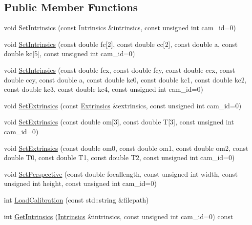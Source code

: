 \subsection*{Public Member Functions}
\begin{DoxyCompactItemize}
\item 
void \hyperlink{classsvl_camera_geometry_afd04c0b03461193e1a8846c2e8849d02}{Set\+Intrinsics} (const \hyperlink{classsvl_camera_geometry_a864f6359614466009baca0666e6bc08e}{Intrinsics} \&intrinsics, const unsigned int cam\+\_\+id=0)
\item 
void \hyperlink{classsvl_camera_geometry_a4994a30449a486e38881b2c38fa39391}{Set\+Intrinsics} (const double fc\mbox{[}2\mbox{]}, const double cc\mbox{[}2\mbox{]}, const double a, const double kc\mbox{[}5\mbox{]}, const unsigned int cam\+\_\+id=0)
\item 
void \hyperlink{classsvl_camera_geometry_a517c798c56ff938f5f246b548101dd36}{Set\+Intrinsics} (const double fcx, const double fcy, const double ccx, const double ccy, const double a, const double kc0, const double kc1, const double kc2, const double kc3, const double kc4, const unsigned int cam\+\_\+id=0)
\item 
void \hyperlink{classsvl_camera_geometry_aba596f7fc002c398cb3320b3bc6ace1e}{Set\+Extrinsics} (const \hyperlink{classsvl_camera_geometry_a6954baa4bd0cc3577af09e13b1c18545}{Extrinsics} \&extrinsics, const unsigned int cam\+\_\+id=0)
\item 
void \hyperlink{classsvl_camera_geometry_a486aef0dc5c9e95e7132cb3b513efe82}{Set\+Extrinsics} (const double om\mbox{[}3\mbox{]}, const double T\mbox{[}3\mbox{]}, const unsigned int cam\+\_\+id=0)
\item 
void \hyperlink{classsvl_camera_geometry_aec32b7236293a114b55bbb82bc4c1c9a}{Set\+Extrinsics} (const double om0, const double om1, const double om2, const double T0, const double T1, const double T2, const unsigned int cam\+\_\+id=0)
\item 
void \hyperlink{classsvl_camera_geometry_af7aba4713343fe5ea6583bc08734b05d}{Set\+Perspective} (const double focallength, const unsigned int width, const unsigned int height, const unsigned int cam\+\_\+id=0)
\item 
int \hyperlink{classsvl_camera_geometry_ac5e3985ffff5a5a056c6a67c09eedf0f}{Load\+Calibration} (const std\+::string \&filepath)
\item 
int \hyperlink{classsvl_camera_geometry_aa1f27e5c312c43e7661a3f4b4f97fadc}{Get\+Intrinsics} (\hyperlink{classsvl_camera_geometry_a864f6359614466009baca0666e6bc08e}{Intrinsics} \&intrinsics, const unsigned int cam\+\_\+id=0) const 

\end{DoxyCompactItemize}
